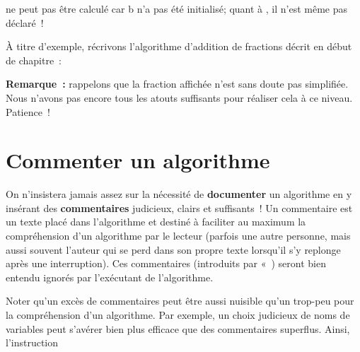 		 ne peut pas être calculé car b n’a pas été initialisé;
		quant à , il n’est même pas déclaré~!

		\bigskip
			
		À titre d’exemple, récrivons l’algorithme d’addition de fractions décrit
		en début de chapitre~:

		
		\textbf{Remarque~:}
		rappelons que la fraction affichée n’est sans doute pas simplifiée. 
		Nous n’avons pas encore tous les atouts suffisants pour réaliser 
		cela à ce niveau. Patience~!

	\section{Commenter un algorithme}

		On n’insistera jamais assez sur la nécessité de \textbf{documenter} un
		algorithme en y insérant des \textbf{commentaires} judicieux, clairs et
		suffisants~! Un commentaire est un texte placé dans
		l’algorithme et destiné à faciliter au maximum la
		compréhension d’un algorithme par le lecteur (parfois une autre
		personne, mais aussi souvent l’auteur qui se perd dans
		son propre texte lorsqu’il s’y replonge après une
		interruption). Ces commentaires (introduits par
		«~) seront bien entendu ignorés par
		l’exécutant de l’algorithme.


		Noter qu’un excès de commentaires peut être aussi nuisible qu’un
		trop-peu pour la compréhension d’un algorithme. Par exemple, un choix
		judicieux de noms de variables peut s’avérer bien plus efficace que des
		commentaires superflus. Ainsi, l’instruction

